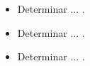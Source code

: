 \documentclass[../main.tex]{subfiles}
\begin{document}
\begin{itemize}
    \item 
    Determinar ... .
    \item
    Determinar ... .
    \item
    Determinar ... .
\end{itemize}
\end{document}
